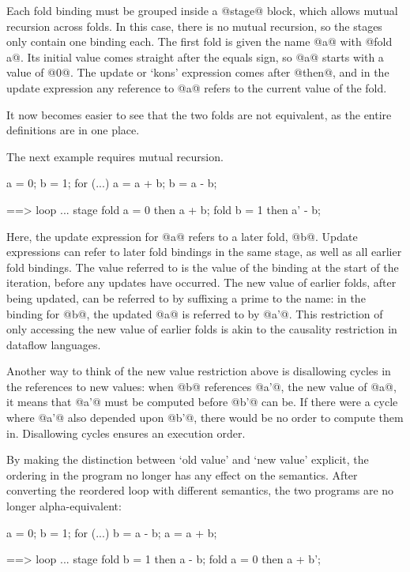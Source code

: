 Each fold binding must be grouped inside a @stage@ block, which allows mutual recursion across folds.
In this case, there is no mutual recursion, so the stages only contain one binding each.
The first fold is given the name @a@ with @fold a@.
Its initial value comes straight after the equals sign, so @a@ starts with a value of @0@.
The update or `kons' expression comes after @then@, and in the update expression any reference to @a@ refers to the current value of the fold.

It now becomes easier to see that the two folds are not equivalent, as the entire definitions are in one place.

The next example requires mutual recursion.
\begin{code}
a = 0;
b = 1;
for (...) {
  a = a + b;
  b = a - b;
}

==>
loop ... {
  stage {
    fold a = 0
        then a + b;
    fold b = 1
        then a' - b;
  }
}
\end{code}

Here, the update expression for @a@ refers to a later fold, @b@.
Update expressions can refer to later fold bindings in the same stage, as well as all earlier fold bindings.
The value referred to is the value of the binding at the start of the iteration, before any updates have occurred.
The new value of earlier folds, after being updated, can be referred to by suffixing a prime to the name: in the binding for @b@, the updated @a@ is referred to by @a'@.
This restriction of only accessing the new value of earlier folds is akin to the causality restriction in dataflow languages\cite{mandel2010lucy}.

Another way to think of the new value restriction above is disallowing cycles in the references to new values:
when @b@ references @a'@, the new value of @a@, it means that @a'@ must be computed before @b'@ can be.
If there were a cycle where @a'@ also depended upon @b'@, there would be no order to compute them in.
Disallowing cycles ensures an execution order.

By making the distinction between `old value' and `new value' explicit, the ordering in the program no longer has any effect on the semantics.
After converting the reordered loop with different semantics, the two programs are no longer alpha-equivalent:
\begin{code}
a = 0;
b = 1;
for (...) {
  b = a - b;
  a = a + b;
}

==>
loop ... {
  stage {
    fold b = 1
        then a - b;
    fold a = 0
        then a + b';
  }
}
\end{code}

